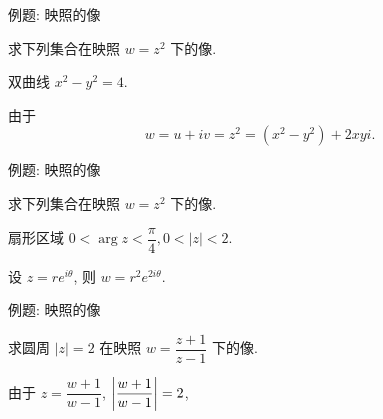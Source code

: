 \begin{frame}{例题: 映照的像}
\onslide<+->
\begin{example}
求下列集合在映照 $w=z^2$ 下的像.

 双曲线 $x^2-y^2=4$.
\end{example}
\onslide<+->
\begin{solution*}
由于 \[w=u+iv=z^2=(x^2-y^2)+2xyi.\]

\end{solution*}
\end{frame}


\begin{frame}{例题: 映照的像}
\onslide<+->
\begin{example}
求下列集合在映照 $w=z^2$ 下的像.

 扇形区域 $0<\arg z<\dfrac\pi4,0<|z|<2$.
\end{example}
\onslide<+->
\begin{solution}
设 $z=re^{i\theta}$, 则 $w=r^2e^{2i\theta}$.
\end{solution}
\end{frame}


\begin{frame}{例题: 映照的像}
\onslide<+->
\begin{example}
求圆周 $|z|=2$ 在映照 $w=\dfrac{z+1}{z-1}$ 下的像.
\end{example}
\onslide<+->
\begin{solution}
由于 $z=\dfrac{w+1}{w-1}$, $\left|\dfrac{w+1}{w-1}\right|=2$,
\vspace{-\baselineskip}
\onslide<+->{
\[w\ov w-\frac53 w-\frac53\ov w+1=0,\quad \abs{w-\frac53}^2=\dfrac{16}9,\]}
\end{solution}
\end{frame}


